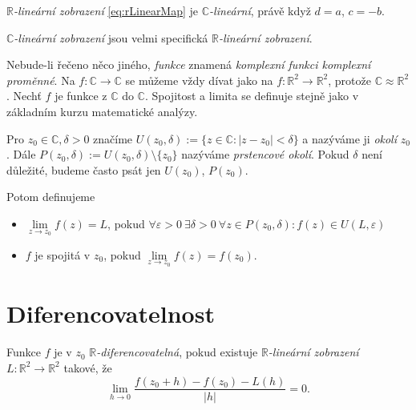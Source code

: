 \begin{observation}
$\mathbb{R}$\emph{-lineární zobrazení} \cref{eq:rLinearMap} je $\mathbb{C}$\emph{-lineární}, právě když $d = a$, $ c = -b$.
\end{observation} 

\begin{note}
$\mathbb{C}$\emph{-lineární zobrazení} jsou velmi specifická $\mathbb{R}$\emph{-lineární zobrazení}.
\end{note}

\begin{agreement}
Nebude-li řečeno něco jiného, \emph{funkce} znamená \emph{komplexní funkci komplexní proměnné}. Na $f: \mathbb{C} \to \mathbb{C}$ se můžeme vždy dívat jako na $f: \mathbb{R}^2 \to \mathbb{R}^2$, protože $\mathbb{C}\approx\mathbb{R}^2$.
Nechť $f$ je funkce z $\mathbb{C}$ do $\mathbb{C}$. Spojitost a limita se definuje stejně jako v základním kurzu matematické analýzy.
\end{agreement}
\begin{definition}
Pro $z_0\in\mathbb{C}, \delta>0$ značíme $U(z_0,\delta):= \{z\in\mathbb{C}: |z-z_0|<\delta\}$ a nazýváme ji \emph{okolí} $z_0$. Dále $P(z_0,\delta):= U(z_0,\delta)\setminus\{z_0\}$ nazýváme \emph{prstencové okolí}. Pokud $\delta$ není důležité, budeme často psát jen $U(z_0)$, $P(z_0)$.

Potom definujeme
\begin{itemize}
    \item $\underset{{z\to z_0}}{\lim}{f(z)} = L$, pokud $\forall\varepsilon>0\ \exists\delta>0\ \forall{z\in P(z_0,\delta)}: f(z)\in U(L, \varepsilon)$
    \item $f$ je spojitá v $z_0$, pokud $\underset{{z\to z_0}}{\lim}{f(z)} = f(z_0)$.
\end{itemize}
\end{definition} 


\section{Diferencovatelnost}
\begin{definition}
Funkce $f$ je v $z_0$ $\mathbb{R}$\emph{-diferencovatelná}, pokud existuje $\mathbb{R}$\emph{-lineární zobrazení} \\$L: \mathbb{R}^2\to\mathbb{R}^2$ takové, že
$$\lim_{h\to 0}\frac{f(z_0+h)-f(z_0)-L(h)}{|h|} = 0.$$
\end{definition} 


